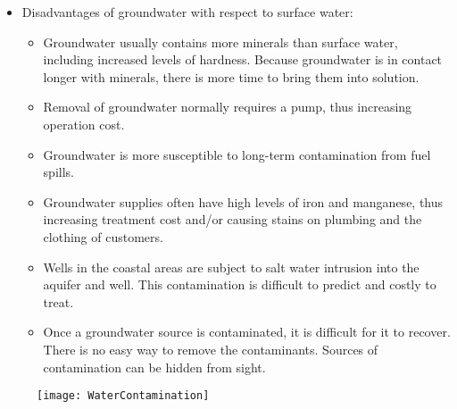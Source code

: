 \begin{itemize}
\item Disadvantages of groundwater with respect to surface water:\\
\begin{itemize}
\item Groundwater usually contains more minerals than surface water, including increased levels of hardness. Because groundwater is in contact longer with minerals, there is more time to bring them into solution.
\item Removal of groundwater normally requires a pump, thus increasing operation cost.
\item Groundwater is more susceptible to long-term contamination from fuel spills.
\item Groundwater supplies often have high levels of iron and manganese, thus increasing treatment cost and/or causing stains on plumbing and the clothing of customers.
\item Wells in the coastal areas are subject to salt water intrusion into the aquifer
and well. This contamination is difficult to predict and costly to treat.
\item Once a groundwater source is contaminated, it is difficult for it to recover. There is no easy way to remove the contaminants. Sources of contamination can be hidden from sight.
\end{itemize}
\end{itemize}
\begin{figure}
\begin{center}
\texttt{[image: WaterContamination]}\\
\label{Sources of water contamination}
\end{center}
\end{figure}
